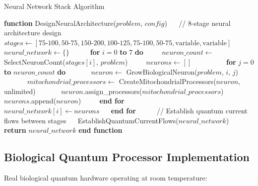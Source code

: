 \documentclass[12pt,a4paper]{article}
\theoremstyle{definition}
\begin{document}
{\begin{algorithm}
\caption{Neural Network Stack Algorithm}
\begin{algorithmic}[1]
\STATE \textbf{function} DesignNeuralArchitecture($problem$, $config$)
\STATE $\quad$ // 8-stage neural architecture design
\STATE $\quad$ $stages \leftarrow [75\text{-}100, 50\text{-}75, 150\text{-}200, 100\text{-}125, 75\text{-}100, 50\text{-}75, \text{variable}, \text{variable}]$
\STATE $\quad$ $neural\_network \leftarrow \{\}$
\STATE $\quad$
\STATE $\quad$ \textbf{for} $i = 0$ \textbf{to} $7$ \textbf{do}
\STATE $\quad\quad$ $neuron\_count \leftarrow$ SelectNeuronCount($stages[i]$, $problem$)
\STATE $\quad\quad$ $neurons \leftarrow []$
\STATE $\quad\quad$
\STATE $\quad\quad$ \textbf{for} $j = 0$ \textbf{to} $neuron\_count$ \textbf{do}
\STATE $\quad\quad\quad$ $neuron \leftarrow$ GrowBiologicalNeuron($problem$, $i$, $j$)
\STATE $\quad\quad\quad$ $mitochondrial\_processors \leftarrow$ CreateMitochondrialProcessors($neuron$, unlimited)
\STATE $\quad\quad\quad$ $neuron$.assign\_processors($mitochondrial\_processors$)
\STATE $\quad\quad\quad$ $neurons$.append($neuron$)
\STATE $\quad\quad$ \textbf{end for}
\STATE $\quad\quad$
\STATE $\quad\quad$ $neural\_network[i] \leftarrow neurons$
\STATE $\quad$ \textbf{end for}
\STATE $\quad$
\STATE $\quad$ // Establish quantum current flows between stages
\STATE $\quad$ EstablishQuantumCurrentFlows($neural\_network$)
\STATE $\quad$ \textbf{return} $neural\_network$
\STATE \textbf{end function}
\end{algorithmic}
\end{algorithm}

\subsection{Biological Quantum Processor Implementation}

Real biological quantum hardware operating at room temperature:

}
\end{document}
